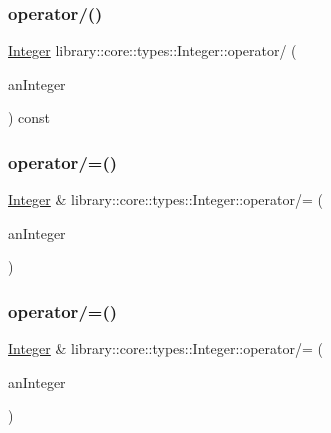 \subsubsection{\texorpdfstring{operator/()}{operator/()}\hspace{0.1cm}{\footnotesize\ttfamily [2/2]}}
{\footnotesize\ttfamily \hyperlink{classlibrary_1_1core_1_1types_1_1Integer}{Integer} library\+::core\+::types\+::\+Integer\+::operator/ (\begin{DoxyParamCaption}\item[{const \hyperlink{classlibrary_1_1core_1_1types_1_1Integer_a623afb1580f870fd8a1997b1c12c917d}{Integer\+::\+Value\+Type} \&}]{an\+Integer }\end{DoxyParamCaption}) const}

\mbox{\label{classlibrary_1_1core_1_1types_1_1Integer_aaf72e97cae17baba1b2bd216898df8a8}} 
\subsubsection{\texorpdfstring{operator/=()}{operator/=()}\hspace{0.1cm}{\footnotesize\ttfamily [1/2]}}
{\footnotesize\ttfamily \hyperlink{classlibrary_1_1core_1_1types_1_1Integer}{Integer} \& library\+::core\+::types\+::\+Integer\+::operator/= (\begin{DoxyParamCaption}\item[{const \hyperlink{classlibrary_1_1core_1_1types_1_1Integer}{Integer} \&}]{an\+Integer }\end{DoxyParamCaption})}

\mbox{\label{classlibrary_1_1core_1_1types_1_1Integer_a5358ac7b2be0f83ebd2fccb1e9593e24}} 
\subsubsection{\texorpdfstring{operator/=()}{operator/=()}\hspace{0.1cm}{\footnotesize\ttfamily [2/2]}}
{\footnotesize\ttfamily \hyperlink{classlibrary_1_1core_1_1types_1_1Integer}{Integer} \& library\+::core\+::types\+::\+Integer\+::operator/= (\begin{DoxyParamCaption}\item[{const \hyperlink{classlibrary_1_1core_1_1types_1_1Integer_a623afb1580f870fd8a1997b1c12c917d}{Integer\+::\+Value\+Type} \&}]{an\+Integer }\end{DoxyParamCaption})}


